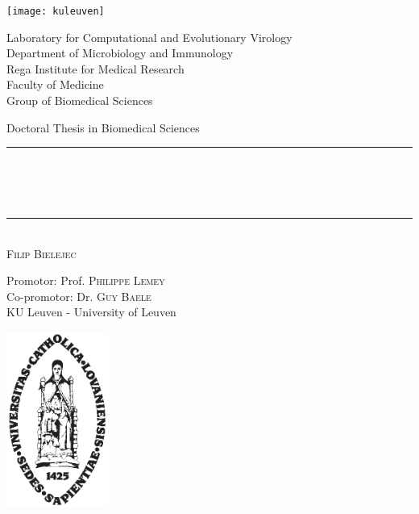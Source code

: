 \begin{titlepage}
	\begin{addmargin}[-1cm]{-3cm}
    \begin{center}
    
    
    \texttt{[image: kuleuven]}
    
    
        \large
        Laboratory for Computational and Evolutionary Virology\\ 
        Department of Microbiology and Immunology\\        
        Rega Institute for Medical Research\\
        Faculty of Medicine\\
        Group of Biomedical Sciences\\

        \vfill

        Doctoral Thesis in Biomedical Sciences\\ \vskip1cm
        \rule{14cm}{0.4pt}\\ \bigskip
        \begingroup
            \Large
            \color{maroon}\spacedallcaps{\myTitle} \\ \bigskip
        \endgroup
        \spacedlowsmallcaps{\mySubtitle} \\ \bigskip
        \rule{14cm}{0.4pt}\\ \vskip1cm
        \textsc{Filip Bielejec}

        \vfill
        \vfill
        \vfill

        \hfill Promotor: Prof. \textsc{Philippe Lemey}\\
        \hfill Co-promotor: Dr. \textsc{Guy Baele}\\
        \hfill KU Leuven - University of Leuven\\
        \hfill {}
    \end{center}
    \vspace{-3.5cm}\includegraphics[width=0.25\textwidth]{figures/sedes}
  \end{addmargin}
\end{titlepage}
